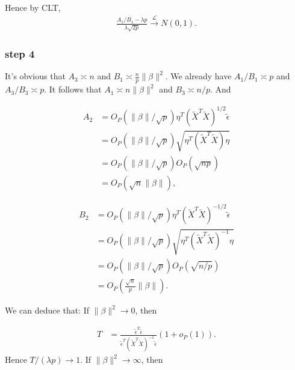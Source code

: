 \documentclass[review]{elsarticle}
\theoremstyle{plain}
\theoremstyle{definition}
\theoremstyle{remark}
\begin{document}
Hence by CLT,
\begin{equation}
    \begin{aligned}
        \frac{A_1/B_1
    -\lambda p}{\lambda\sqrt{2p}
        }\xrightarrow{\mathcal{L}}N(0,1).
    \end{aligned}
\end{equation}

\subsubsection{step 4}
It's obvious that $A_3\asymp n$ and $B_1\asymp \frac{n}{p}\|\beta\|^2$. We already have $A_1/B_1\asymp p$ and $A_3/B_3\asymp p$. It follows that $A_1\asymp n\|\beta\|^2$ and $B_3\asymp n/p$. And

\begin{equation}
    \begin{aligned}
        A_2&=O_P(\|\beta\|/{\sqrt{p}})\eta^T {(\tilde{X}^T\tilde{X})}^{1/2}\tilde{\epsilon}\\
        &=O_P(\|\beta\|/\sqrt{p})\sqrt{\eta^T{(\tilde{X}^T\tilde{X})}\eta}\\
        &=O_P(\|\beta\|/\sqrt{p})O_P(\sqrt{np})\\
        &=O_P(\sqrt{n}\|\beta\|),
    \end{aligned}
\end{equation}

\begin{equation}
    \begin{aligned}
        B_2&=O_P(\|\beta\|/{\sqrt{p}})\eta^T {(\tilde{X}^T\tilde{X})}^{-1/2}\tilde{\epsilon}\\
        &=O_P(\|\beta\|/\sqrt{p})\sqrt{\eta^T{(\tilde{X}^T\tilde{X})}^{-1}\eta}\\
        &=O_P(\|\beta\|/\sqrt{p})O_P(\sqrt{n/p})\\
        &=O_P(\frac{\sqrt{n}}{p}\|\beta\|).
    \end{aligned}
\end{equation}



We can deduce that:
If $\|\beta\|^2\to 0$, then

\begin{equation}
    \begin{aligned}
        T&=
        \frac{\tilde{\epsilon}^T\tilde{\epsilon}
    }{\tilde{\epsilon}^T{(\tilde{X}^T\tilde{X})}^{-1}\tilde{\epsilon}
        }(1+o_P(1)).
    \end{aligned}
\end{equation}
Hence $T/(\lambda p)\to 1$.
If $\|\beta\|^2\to \infty$, then
\end{document}
